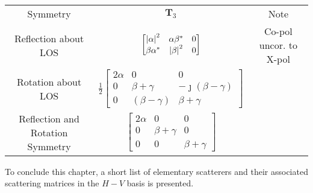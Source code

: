 \documentclass[11pt]{article}
\begin{document}
\begin{table}[b]
	\centering
	\begin{tabular}{ccc}
		\hline
		Symmetry & $\mathbf{T}_{3}$ & Note \\
		Reflection about LOS &
		$\begin{bmatrix}
			\left|\alpha\right|^{2} & \alpha\beta^{*} & 0\\
			\beta\alpha^{*} & \left|\beta\right|^{2} & 0\\
		\end{bmatrix}$ &
		Co-pol uncor. to X-pol \\
		Rotation about LOS&
		$\frac{1}{2}\begin{bmatrix}
			2\alpha & 0 & 0\\
			0 & \beta + \gamma & -\jmath\left(\beta - \gamma\right)\\
			0 & \left(\beta - \gamma\right) & \beta + \gamma
		\end{bmatrix}$ &\\
		Reflection and Rotation Symmetry &
		$\begin{bmatrix}
			2\alpha & 0 & 0\\
			0 & \beta + \gamma & 0\\
			0 & 0 & \beta + \gamma
		\end{bmatrix}$ &\\
	\end{tabular}
\end{table}
\FloatBarrier
To conclude this chapter, a short list of elementary scatterers and their associated scattering matrices in the $H-V$ basis is presented.
\end{document}
